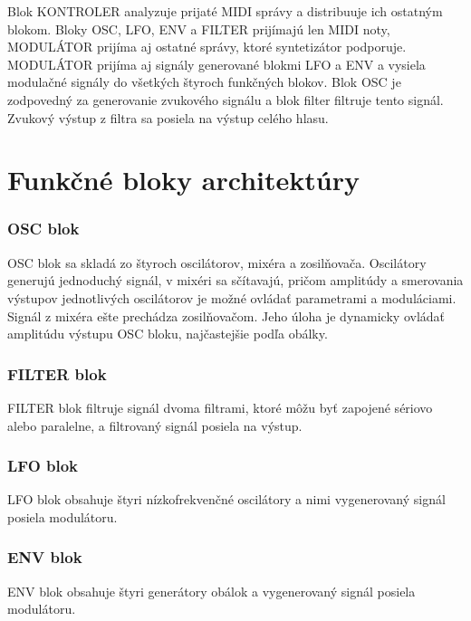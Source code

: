 Blok KONTROLER analyzuje prijaté MIDI správy a distribuuje ich ostatným blokom. Bloky OSC, LFO, ENV a FILTER prijímajú len MIDI noty, MODULÁTOR prijíma aj ostatné správy, ktoré syntetizátor podporuje. MODULÁTOR prijíma aj signály generované blokmi LFO a ENV a vysiela modulačné signály do všetkých štyroch funkčných blokov. Blok OSC je zodpovedný za generovanie zvukového signálu a blok filter filtruje tento signál. Zvukový výstup z filtra sa posiela na výstup celého hlasu.

\section{Funkčné bloky architektúry}

\subsubsection*{OSC blok}

OSC blok sa skladá zo štyroch oscilátorov, mixéra a zosilňovača. Oscilátory generujú jednoduchý signál, v mixéri sa sčítavajú, pričom amplitúdy a smerovania výstupov jednotlivých oscilátorov je možné ovládať parametrami a moduláciami. Signál z mixéra ešte prechádza zosilňovačom. Jeho úloha je dynamicky ovládať amplitúdu výstupu OSC bloku, najčastejšie podľa 
obálky.

\subsubsection*{FILTER blok}

FILTER blok filtruje signál dvoma filtrami, ktoré môžu byť zapojené sériovo alebo paralelne, a filtrovaný signál posiela na výstup.

\subsubsection*{LFO blok}

LFO blok obsahuje štyri nízkofrekvenčné oscilátory a nimi vygenerovaný signál posiela modulátoru.

\subsubsection*{ENV blok}

ENV blok obsahuje štyri generátory obálok a vygenerovaný signál posiela modulátoru.

